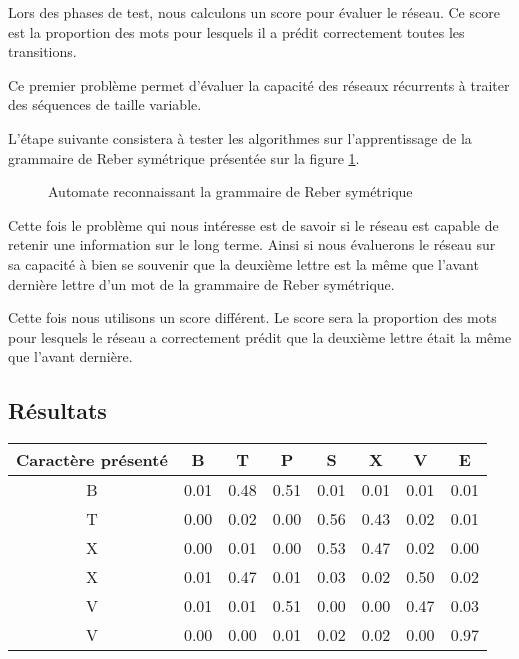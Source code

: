 Lors des phases de test, nous calculons un score pour évaluer le réseau. Ce score est la proportion des mots pour lesquels il a prédit correctement toutes les transitions.

Ce premier problème permet d'évaluer la capacité des réseaux récurrents à traiter des séquences de taille variable.

L'étape suivante consistera à tester les algorithmes sur l'apprentissage de la grammaire de Reber symétrique présentée sur la figure \ref{Grammaire de Reber symétrique}.  
\begin{figure}[h!]
\begin{center}

\caption{Automate reconnaissant la grammaire de Reber symétrique}
\label{Grammaire de Reber symétrique}
\end{center}
\end{figure}

Cette fois le problème qui nous intéresse est de savoir si le réseau est capable de retenir une information sur le long terme. Ainsi si nous évaluerons le réseau sur sa capacité à bien se souvenir que la deuxième lettre est la même que l'avant dernière lettre d'un mot de la grammaire de Reber symétrique.

Cette fois nous utilisons un score différent. Le score sera la proportion des mots pour lesquels le réseau a correctement prédit que la deuxième lettre était la même que l'avant dernière.

\subsection{Résultats}

\begin{center}
\begin{tabular}{|c|c|c|c|c|c|c|c|}
\hline
Caractère présenté & B & T & P & S & X & V & E \\
\hline
B & 0.01 & 0.48 & 0.51 & 0.01 & 0.01 & 0.01 & 0.01 \\
\hline
T & 0.00 & 0.02 & 0.00 & 0.56 & 0.43 & 0.02 & 0.01 \\
\hline
X & 0.00 & 0.01 & 0.00 & 0.53 & 0.47 & 0.02 & 0.00 \\
\hline
X & 0.01 & 0.47 & 0.01 & 0.03 & 0.02 & 0.50 & 0.02 \\
\hline
V & 0.01 & 0.01 & 0.51 & 0.00 & 0.00 & 0.47 & 0.03 \\
\hline
V & 0.00 & 0.00 & 0.01 & 0.02 & 0.02 & 0.00 & 0.97 \\
\hline
\end{tabular}
\end{center}

